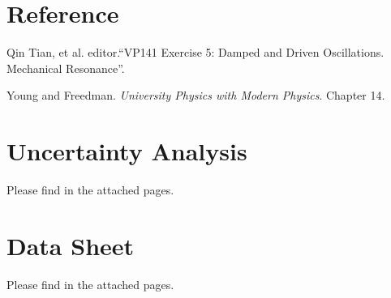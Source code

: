\documentclass[a4paper]{article}
\begin{document}
\section{Reference}

\noindent [1] Qin Tian, et al. editor.``VP141 Exercise 5: Damped and Driven Oscillations. Mechanical Resonance''.

\noindent [2] Young and Freedman. \textit{University Physics with Modern Physics}. Chapter 14.

\newpage



\appendix

\section{Uncertainty Analysis}

Please find in the attached pages.



\section{Data Sheet}

Please find in the attached pages.
\end{document}
